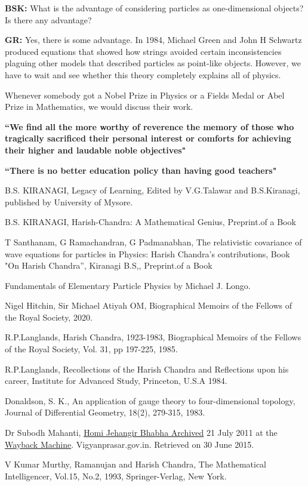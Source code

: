 \textbf{BSK:} What is the advantage of considering particles as one-dimensional objects? Is there any advantage?

\textbf{GR:} Yes, there is some advantage. In 1984, Michael Green and John H Schwartz produced equations that showed how strings avoided certain inconsistencies plaguing other models that described particles as point-like objects. However, we have to wait and see whether this theory completely explains all of physics.

Whenever somebody got a Nobel Prize in Physics or a Fields Medal or Abel Prize in Mathematics, we would discuss their work.

\textbf{``We find all the more worthy of reverence the memory of those who tragically sacrificed their personal interest or comforts for achieving their higher and laudable noble objectives"}

\textbf{``There is no better education policy than having good teachers"}

\begin{thebibliography}{99}
 B.S. KIRANAGI, Legacy of Learning, Edited by V.G.Talawar and B.S.Kiranagi, published by University of Mysore.

 B.S. KIRANAGI, Harish-Chandra: A Mathematical Genius, Preprint.of a Book 

 T Santhanam, G Ramachandran, G Padmanabhan, The relativistic covariance of wave equations for particles in Physics: Harish Chandra's contributions,   Book "On Harish Chandra”, Kiranagi B.S,, Preprint.of a Book

 Fundamentals of Elementary Particle Physics by Michael J. Longo.

 Nigel Hitchin, Sir Michael Atiyah OM, Biographical Memoirs of the Fellows of the Royal Society, 2020.

 R.P.Langlands, Harish Chandra, 1923-1983, Biographical Memoirs of the Fellows of the Royal Society, Vol. 31, pp 197-225, 1985.

 R.P.Langlands, Recollections of the Harish Chandra and Reflections upon his career, Institute for Advanced Study, Princeton, U.S.A 1984.

 Donaldson, S. K., An application of gauge theory to four-dimensional topology, Journal of Differential Geometry, 18(2), 279-315, 1983.

 Dr Subodh Mahanti,  \underline{Homi Jehangir Bhabha Archived} 21 July 2011 at the \underline{Wayback Machine}. Vigyanprasar.gov.in. Retrieved on 30 June 2015.

 V Kumar Murthy, Ramanujan and Harish Chandra, The Mathematical Intelligencer, Vol.15, No.2, 1993, Springer-Verlag, New York.

\end{thebibliography}

